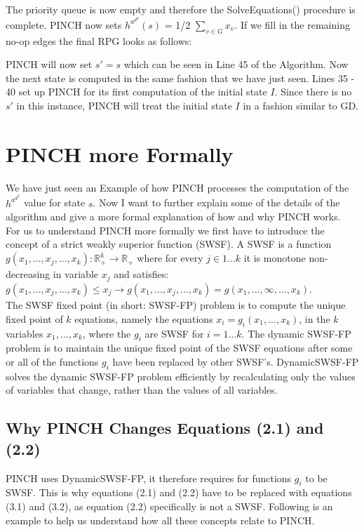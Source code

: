 The priority queue is now empty and therefore the SolveEquations() procedure is complete. PINCH now sets $h^a^d^d(s)$ = 1/2 $\sum_{v \in G}^{} x_v$. If we fill in the remaining no-op edges the final RPG looks as follows:

PINCH will now set $s' = s$ which can be seen in Line 45 of the Algorithm. Now the next state is computed in the same fashion that we have just seen. Lines 35 - 40 set up PINCH for its first computation of the initial state $I$. Since there is no $s'$ in this instance, PINCH will treat the initial state $I$ in a fashion similar to GD.\\
\newpage
\section{PINCH more Formally}
We have just seen an Example of how PINCH processes the computation of the $h^a^d^d$ value for state $s$. Now I want to further explain some of the details of the algorithm and give a more formal explanation of how and why PINCH works.\\

For us to understand PINCH more formally we first have to introduce the concept of a strict weakly superior function (SWSF). A SWSF is a function $g(x_1,...,x_j,...,x_k): \mathbb{R}^k_+ \xrightarrow[\text{}]{\text{}} \mathbb{R}_+$ where for every $j \in 1...k$ it is monotone non-decreasing in variable $x_j$ and satisfies: $g(x_1,...,x_j,...,x_k) \leq x_j \xrightarrow[\text{}]{\text{}} g(x_1,...,x_j,...,x_k) = g(x_1,...,\infty,...,x_k) $.\\

The SWSF fixed point (in short: SWSF-FP) problem is to compute the unique fixed point of $k$ equations, namely the equations $x_i = g_i(x_1, . . . , x_k)$, in the $k$ variables $x_1, . . . , x_k$, where the $g_i$ are SWSF for $i = 1 . . . k$. The dynamic SWSF-FP problem is to maintain the unique fixed point of the SWSF equations after some or all of the functions $g_i$ have been replaced by other SWSF’s. DynamicSWSF-FP solves the dynamic SWSF-FP problem efficiently by recalculating only the values of variables that change, rather than the values of all variables. \cite{main}\\

\subsection{Why PINCH Changes Equations (2.1) and (2.2)}
PINCH uses DynamicSWSF-FP, it therefore requires for functions $g_i$ to be SWSF. This is why equations (2.1) and (2.2) have to be replaced with equations (3.1) and (3.2), as equation (2.2) specifically is not a SWSF. Following is an example to help us understand how all these concepts relate to PINCH.\\

